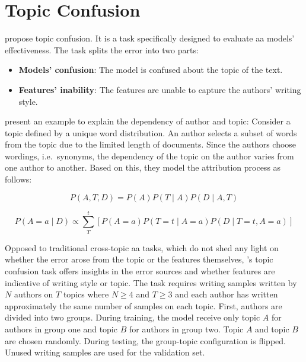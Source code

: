 \section{Topic Confusion}
\label{sec:topic_confusion}

\citet{altakrori_topic_2021} propose topic confusion.
It is a task specifically designed to evaluate \ac{aa} models' effectiveness.
The task splits the error into two parts:
\begin{itemize}
    \item \textbf{Models' confusion}: The model is confused about the topic of the text.
    \item \textbf{Features' inability}: The features are unable to capture the authors' writing style.
\end{itemize}

\citet{altakrori_topic_2021} present an example to explain the dependency of author and topic:
Consider a topic defined by a unique word distribution.
An author selects a subset of words from the topic due to the limited length of documents.
Since the authors choose wordings, i.e.\ synonyms, the dependency of the topic on the author varies from one author to another.
Based on this, they model the attribution process as follows:

\begin{equation}
    \label{eq:topic_confusion_model_world}
    P(A,T,D) = P(A) P(T \mid A)P(D\mid A,T)
\end{equation}

\begin{equation}
    \label{eq:topic_confusion_attribution_process}
    P(A=a \mid D) \propto \sum_{T}^{t}\left[ P(A=a) P(T=t \mid A = a)P(D\mid T=t,A=a) \right]
\end{equation}

Opposed to traditional cross-topic \ac{aa} tasks, 
which do not shed any light on whether the error arose from the topic or the features themselves, 
\citet{altakrori_topic_2021}'s topic confusion task offers insights in the error sources and 
whether features are indicative of writing style or topic.
The task requires writing samples written by $N$ authors on $T$ topics where $N \geq 4$ and $T \geq 3$ and 
each author has written approximately the same number of samples on each topic.
First, authors are divided into two groups.
During training, the model receive only topic $A$ for authors in group one and topic $B$ for authors in group two.
Topic $A$ and topic $B$ are chosen randomly.
During testing, the group-topic configuration is flipped.
Unused writing samples are used for the validation set.

